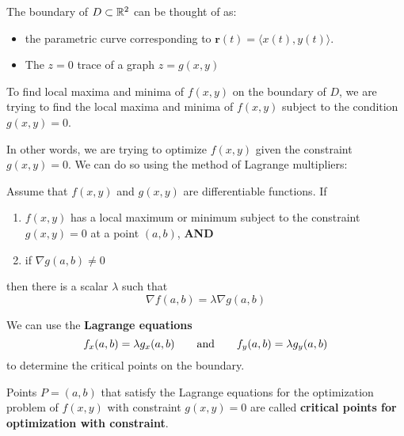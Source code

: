 \begin{remark}
    The boundary of $D \subset \mathbb{R}^2$ can be thought of as:
    \vspace{1em}
    
    \begin{itemize}\setlength\itemsep{1em}
        \item the parametric curve corresponding to $\bm{r}(t) = \langle x(t),y(t) \rangle$.
        \item The $z=0$ trace of a graph $z = g(x,y)$
    \end{itemize}
    
    \end{remark}

    To find local maxima and minima of $f(x,y)$ on the boundary of $D$, we are trying to find the local maxima and minima of $f(x,y)$ subject to the condition $g(x,y) = 0$.
    
    \vspace{1em}
    
    In other words, we are trying to optimize $f(x,y)$ given the constraint $g(x,y) = 0$.  We can do so using the method of Lagrange multipliers:
    
    \begin{theorem}
    Assume that $f(x,y)$ and $g(x,y)$ are differentiable functions.  If 
    \begin{enumerate}
        \item  $f(x,y)$ has a local maximum or minimum subject to the constraint $g(x,y)=0$ at a point $(a,b)$, \textbf{AND}
        \item if $\nabla g(a,b) \neq 0$
    \end{enumerate}
    
    then there is a scalar $\lambda$ such that 
    $$\nabla f(a,b) = \lambda \nabla g(a,b)$$
    \end{theorem}

    \begin{corollary}
    We can use the \textbf{Lagrange equations} 
    $$f_x(a,b) = \lambda g_x(a,b) \qquad \textnormal{and} \qquad f_y(a,b) = \lambda g_y(a,b)$$
    to determine the critical points on the boundary.
    \end{corollary}
    
    \begin{definition}
    Points $P = (a,b)$ that satisfy the Lagrange equations for the optimization problem of $f(x,y)$ with constraint $g(x,y) = 0$ are called \textbf{critical points for optimization with constraint}.
    \end{definition}

